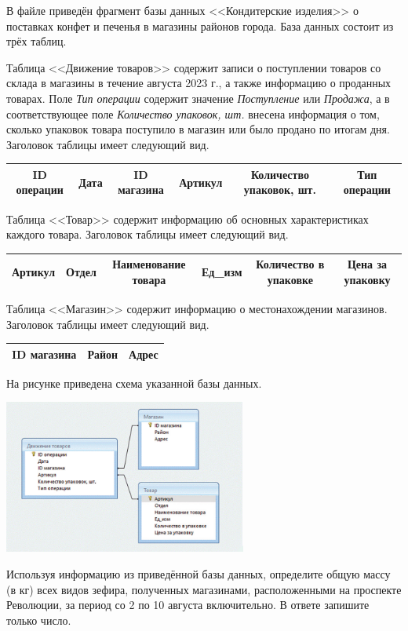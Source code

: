 \documentclass[14pt,a4paper]{article}
\begin{document}
В файле приведён фрагмент базы данных <<Кондитерские изделия>>
о поставках конфет и печенья в магазины районов города. База данных
состоит из трёх таблиц.

Таблица <<Движение товаров>> содержит записи о поступлении товаров со
склада в магазины в течение августа 2023 г., а также информацию о
проданных товарах. Поле \textit{Тип операции} содержит значение
\textit{Поступление} или \textit{Продажа}, а в соответствующее поле
\textit{Количество упаковок, шт.} внесена информация о том, сколько
упаковок товара поступило в магазин или было продано по итогам дня.
Заголовок таблицы имеет следующий вид.

\begin{center}
    \begin{tabular}{|c|c|c|c|c|c|}
        \hline
        ID операции & Дата & ID магазина & Артикул & Количество упаковок, шт. & Тип операции \\
        \hline
    \end{tabular}
\end{center}

Таблица <<Товар>> содержит информацию об основных характеристиках
каждого товара. Заголовок таблицы имеет следующий вид.

\begin{center}
    \begin{tabular}{|c|c|c|c|c|c|}
        \hline
        Артикул & Отдел & Наименование товара & Ед\_изм & Количество в упаковке & Цена за упаковку \\
        \hline
    \end{tabular}
\end{center}

Таблица <<Магазин>> содержит информацию о местонахождении магазинов.
Заголовок таблицы имеет следующий вид.

\begin{center}
    \begin{tabular}{|c|c|c|}
        \hline
        ID магазина & Район & Адрес \\
        \hline
    \end{tabular}
\end{center}

На рисунке приведена схема указанной базы данных.

\begin{center}
    \includegraphics[width=0.6\textwidth]{table.png}
\end{center}

Используя информацию из приведённой базы данных, определите общую
массу (в кг) всех видов зефира, полученных магазинами, расположенными
на проспекте Революции, за период со 2 по 10 августа включительно.
В ответе запишите только число.
\end{document}
